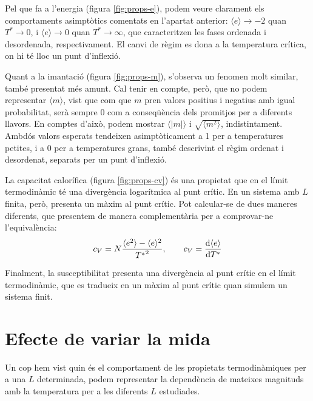 \documentclass[a4paper]{article}
\begin{document}
Pel que fa a l'energia (figura \ref{fig:props-e}), podem veure clarament els comportaments asimptòtics comentats en l'apartat anterior: $\langle e \rangle \to -2$ quan $T^* \to 0$, i $\langle e \rangle \to 0$ quan $T^* \to \infty$, que caracteritzen les fases ordenada i desordenada, respectivament. El canvi de règim es dona a la temperatura crítica, on hi té lloc un punt d'inflexió.

Quant a la imantació (figura \ref{fig:props-m}), s'observa un fenomen molt similar, també presentat més amunt. Cal tenir en compte, però, que no podem representar $\langle m \rangle$, vist que com que $m$ pren valors positius i negatius amb igual probabilitat, serà sempre 0 com a conseqüència dels promitjos per a diferents llavors. En comptes d'això, podem mostrar $\langle |m| \rangle$ i $\sqrt{\langle m^2 \rangle}$, indistintament. Ambdós valors esperats tendeixen asimptòticament a 1 per a temperatures petites, i a 0 per a temperatures grans, també descrivint el règim ordenat i desordenat, separats per un punt d'inflexió.

La capacitat calorífica (figura \ref{fig:props-cv}) és una propietat que en el límit termodinàmic té una divergència logarítmica al punt crític. En un sistema amb $L$ finita, però, presenta un màxim al punt crític. Pot calcular-se de dues maneres diferents, que presentem de manera complementària per a comprovar-ne l'equivalència:
\begin{equation*}
    c_V = N \frac{\langle e^2 \rangle - \langle e \rangle^2}{{T^*}^2}, \qquad c_V = \dv{\langle e \rangle}{T^*}
\end{equation*}

Finalment, la susceptibilitat presenta una divergència al punt crític en el límit termodinàmic, que es tradueix en un màxim al punt crític quan simulem un sistema finit.

\section{Efecte de variar la mida}

Un cop hem vist quin és el comportament de les propietats termodinàmiques per a una $L$ determinada, podem representar la dependència de mateixes magnituds amb la temperatura per a les diferents $L$ estudiades.
\end{document}
